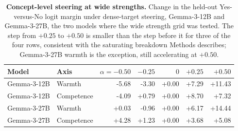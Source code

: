 \begin{table}[H]
\centering
\small
\setlength{\tabcolsep}{4pt}
\begin{tabular}{@{}llrrrrr@{}}
\toprule
Model & Axis & $\alpha=-0.50$ & $-0.25$ & $0$ & $+0.25$ & $+0.50$ \\
\midrule
Gemma-3-12B & Warmth & -5.68 & -3.30 & +0.00 & +7.29 & +11.43 \\
Gemma-3-12B & Competence & -4.09 & +0.79 & +0.00 & +8.70 & +7.32 \\
Gemma-3-27B & Warmth & +0.03 & -0.96 & +0.00 & +6.17 & +14.44 \\
Gemma-3-27B & Competence & +4.28 & +1.23 & +0.00 & +3.68 & +5.08 \\
\bottomrule
\end{tabular}
\caption{\textbf{Concept-level steering at wide strengths.} Change in the held-out Yes-versus-No logit margin under dense-target steering, Gemma-3-12B and Gemma-3-27B, the two models where the wide strength grid was tested. The step from $+0.25$ to $+0.50$ is smaller than the step before it for three of the four rows, consistent with the saturating breakdown Methods describes; Gemma-3-27B warmth is the exception, still accelerating at $+0.50$.}
\label{tab:concept_saturation}
\end{table}
